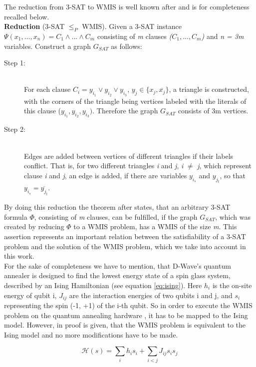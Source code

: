 The reduction from 3-SAT to WMIS is well known after \cite{choi2010adiabatic} and is for completeness recalled below.\\

\textbf{Reduction} (3-SAT $\leq_ {P}$ WMIS).
Given a 3-SAT instance $\Psi(x_{1}, \dots, x_{n}) = C_{1} \wedge ... \wedge C_{m}$ consisting of \emph{m} clauses \emph{($C_{1}, ..., C_{m}$)} and \emph{n = 3m} variables. Construct a graph $G_{SAT}$ as follows:
\begin{description}
	\item[Step 1:]\hfill \\
	For each clause $C_{i} = y_{i_{1}} \vee y_{i_{2}} \vee y_{i_{3}}$, $y_{j} \in \{x_{j}, \overline{x_{j}}\}$, a triangle is constructed, with the corners of the triangle being vertices labeled with the literals of this clause ($y_{i_{1}}, y_{i_{2}}, y_{i_{3}})$. Therefore the graph $G_{SAT}$ consists of 3m vertices.
	\item[Step 2:]\hfill \\
	Edges are added between vertices of different triangles if their labels conflict. That is, for two different triangles \emph{i} and \emph{j}, \emph{i} $\neq$ \emph{j}, which represent clause \emph{i} and \emph{j}, an edge is added, if there are variables $y_{i_{s}}$ and $y_{j_{t}}$, so that $y_{i_{s}} = \overline{y_{j_{t}}}$.
\end{description}

By doing this reduction the theorem after \cite{choi2010adiabatic} states, that an arbitrary 3-SAT formula $\Phi$, consisting of \emph{m} clauses, can be fulfilled, if the graph $G_{SAT}$, which was created by reducing $\Phi$ to a WMIS problem, has a WMIS of the size \emph{m}. 
This assertion represents an important relation between the satisfiability of a 3-SAT problem and the solution of the WMIS problem, which we take into account in this work.\\

For the sake of completeness we have to mention, that D-Wave's quantum annealer is designed to find the lowest energy state of a spin glass system, described by an Ising Hamiltonian (see equation \ref{eq:ising}). Here $ h_{i}$ is the on-site energy of qubit i, $J_{ij}$ are the interaction energies of two qubits i and j, and $s_{i}$ representing the spin (-1, +1) of the i-th qubit. So in order to execute the WMIS problem on the quantum annealing hardware , it has to be mapped to the Ising model. However, in \cite{choi2008minor} proof is given, that the WMIS problem is equivalent to the Ising model and no more modifications have to be made.

\begin{equation}\label{eq:ising}
	\mathcal{H}(s) = \sum_{i} h_{i}s_{i} + \sum_{i<j} J_{ij}s_{i}s_{j}
\end{equation}

